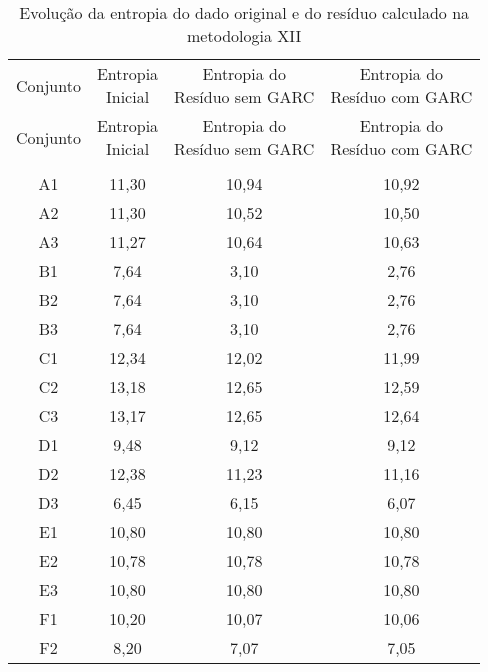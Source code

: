 \begin{center}
\begin{longtable}{cccc}
\toprule
\rowcolor{white}
\caption[Metodologia XII: evolução da entropia]{Evolução da entropia do dado
original e do resíduo calculado na metodologia XII}
\label{tab:EvolucaoEntropiaMet12}\\
\midrule
Conjunto & \specialcell{Entropia \\Inicial} & \specialcell{Entropia do
\\Resíduo sem GARC} & \specialcell{Entropia do
\\Resíduo com GARC}  \\
\midrule
\endfirsthead
\midrule
\rowcolor{white}
Conjunto & \specialcell{Entropia \\Inicial} & \specialcell{Entropia do
\\Resíduo sem GARC} & \specialcell{Entropia do
\\Resíduo com GARC}  \\
\toprule
\endhead
\midrule \\ %
\endfoot
\bottomrule 
\endlastfoot
    A1    & 11,30 & 10,94 & 10,92 \\
    A2    & 11,30 & 10,52 & 10,50 \\
    A3    & 11,27 & 10,64 & 10,63 \\
    B1    & 7,64  & 3,10  & 2,76 \\
    B2    & 7,64  & 3,10  & 2,76 \\
    B3    & 7,64  & 3,10  & 2,76 \\
    C1    & 12,34 & 12,02 & 11,99 \\
    C2    & 13,18 & 12,65 & 12,59 \\
    C3    & 13,17 & 12,65 & 12,64 \\
    D1    & 9,48  & 9,12  & 9,12 \\
    D2    & 12,38 & 11,23 & 11,16 \\
    D3    & 6,45  & 6,15  & 6,07 \\
    E1    & 10,80 & 10,80 & 10,80 \\
    E2    & 10,78 & 10,78 & 10,78 \\
    E3    & 10,80 & 10,80 & 10,80 \\
    F1    & 10,20 & 10,07 & 10,06 \\
    F2    & 8,20  & 7,07  & 7,05 \\

\end{longtable}
\end{center}

